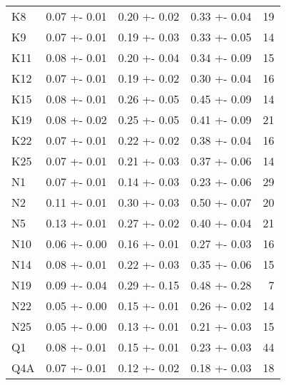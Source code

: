 \begin{longtable}{llllr}
                K8 &       0.07 +- 0.01 &       0.20 +- 0.02 &       0.33 +- 0.04 &                  19 \\
                K9 &       0.07 +- 0.01 &       0.19 +- 0.03 &       0.33 +- 0.05 &                  14 \\
               K11 &       0.08 +- 0.01 &       0.20 +- 0.04 &       0.34 +- 0.09 &                  15 \\
               K12 &       0.07 +- 0.01 &       0.19 +- 0.02 &       0.30 +- 0.04 &                  16 \\
               K15 &       0.08 +- 0.01 &       0.26 +- 0.05 &       0.45 +- 0.09 &                  14 \\
               K19 &       0.08 +- 0.02 &       0.25 +- 0.05 &       0.41 +- 0.09 &                  21 \\
               K22 &       0.07 +- 0.01 &       0.22 +- 0.02 &       0.38 +- 0.04 &                  16 \\
               K25 &       0.07 +- 0.01 &       0.21 +- 0.03 &       0.37 +- 0.06 &                  14 \\
                N1 &       0.07 +- 0.01 &       0.14 +- 0.03 &       0.23 +- 0.06 &                  29 \\
                N2 &       0.11 +- 0.01 &       0.30 +- 0.03 &       0.50 +- 0.07 &                  20 \\
                N5 &       0.13 +- 0.01 &       0.27 +- 0.02 &       0.40 +- 0.04 &                  21 \\
               N10 &       0.06 +- 0.00 &       0.16 +- 0.01 &       0.27 +- 0.03 &                  16 \\
               N14 &       0.08 +- 0.01 &       0.22 +- 0.03 &       0.35 +- 0.06 &                  15 \\
               N19 &       0.09 +- 0.04 &       0.29 +- 0.15 &       0.48 +- 0.28 &                   7 \\
               N22 &       0.05 +- 0.00 &       0.15 +- 0.01 &       0.26 +- 0.02 &                  14 \\
               N25 &       0.05 +- 0.00 &       0.13 +- 0.01 &       0.21 +- 0.03 &                  15 \\
                Q1 &       0.08 +- 0.01 &       0.15 +- 0.01 &       0.23 +- 0.03 &                  44 \\
               Q4A &       0.07 +- 0.01 &       0.12 +- 0.02 &       0.18 +- 0.03 &                  18 \\

\end{longtable}
